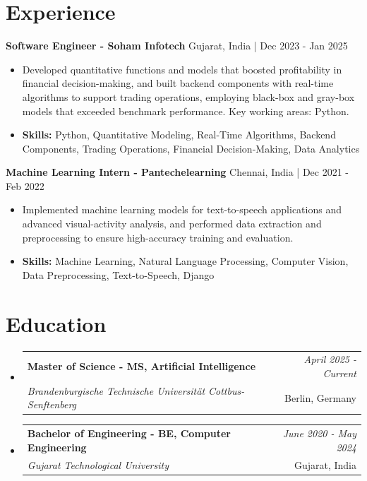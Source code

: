 \documentclass[a4paper,11pt]{article}
\makeatletter
\newcommand{\resumeSubheading}[4]{
\vspace{0.5mm}\item
    \begin{tabular*}{0.98\textwidth}[t]{l@{\extracolsep{\fill}}r}
        \textbf{#1} & \textit{\footnotesize{#4}} \\
        \textit{\footnotesize{#3}} &  \footnotesize{#2}\\
    \end{tabular*}
    \vspace{-2.4mm}
}
\makeatother
\begin{document}
\section{\textbf{Experience}}


\vspace{1mm}
  \textbf{Software Engineer - Soham Infotech} \hfill Gujarat, India | Dec 2023 - Jan 2025
\vspace{-1.5mm} %
\begin{itemize}
  \item Developed quantitative functions and models that boosted profitability in financial decision-making, and built backend components with real-time algorithms to support trading operations, employing black-box and gray-box models that exceeded benchmark performance. Key working areas: Python.

\vspace{-2mm}
  \item \textbf{Skills:} Python, Quantitative Modeling, Real-Time Algorithms, Backend Components, Trading Operations, Financial Decision-Making, Data Analytics
\end{itemize}

\vspace{1mm}
  \textbf{Machine Learning Intern - Pantechelearning} \hfill Chennai, India | Dec 2021 - Feb 2022
\vspace{-1.5mm} %
\begin{itemize}
  \item Implemented machine learning models for text-to-speech applications and advanced visual-activity analysis, and performed data extraction and preprocessing to ensure high-accuracy training and evaluation.
\vspace{-2mm}
  \item \textbf{Skills:} Machine Learning, Natural Language Processing, Computer Vision, Data Preprocessing, Text-to-Speech, Django
\end{itemize}\section{\textbf{Education}}
\vspace{-0.4mm}

\begin{itemize}
\resumeSubheading
{Master of Science - MS, Artificial Intelligence }{Berlin, Germany}
{Brandenburgische Technische Universität Cottbus-Senftenberg  }{April 2025 - Current}

\vspace{1.0mm} %
\resumeSubheading
{Bachelor of Engineering - BE, Computer Engineering  }{Gujarat, India}
{Gujarat Technological University }{June 2020 - May 2024}

\end{itemize}
\end{document}
